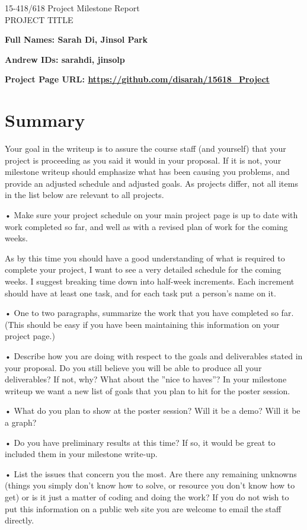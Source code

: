 \documentclass[11pt]{article}
\begin{document}
\begin{center}
\LARGE
15-418/618 \thisterm{} Project Milestone Report
\\ 
PROJECT TITLE
\end{center}
\begin{flushright}
{\large\bf Full Names: Sarah Di, Jinsol Park\makebox[2in][l]{

}}

{\large\bf Andrew IDs: sarahdi, jinsolp\makebox[2in][l]{\tt

}}
\end{flushright}

{\large\bf Project Page URL: \url{https://github.com/disarah/15618\_Project}\makebox[2in][l]{

}}


\section{Summary}
Your goal in the writeup is to assure the course staff (and yourself) that your project is proceeding as you said it would in your proposal. If it is not, your milestone writeup should emphasize what has been causing you problems, and provide an adjusted schedule and adjusted goals. As projects differ, not all items in the list below are relevant to all projects.

• Make sure your project schedule on your main project page is up to date with work completed so far, and well as with a revised plan of work for the coming weeks. 

As by this time you should have a good understanding of what is required to complete your project, I want to see a very detailed schedule for the coming weeks. I suggest breaking time down into half-week increments. Each increment should have at least one task, and for each task put a person’s name on it.

• One to two paragraphs, summarize the work that you have completed so far. (This should be easy if you have been maintaining this information on your project page.)

• Describe how you are doing with respect to the goals and deliverables stated in your proposal. Do you still believe you will be able to produce all your deliverables? If not, why? What about the ”nice to haves”? In your milestone writeup we want a new list of goals that you plan to hit for the poster session.

• What do you plan to show at the poster session? Will it be a demo? Will it be a graph?

• Do you have preliminary results at this time? If so, it would be great to included them in your milestone write-up.

• List the issues that concern you the most. Are there any remaining unknowns (things you simply don’t know how to solve, or resource you don’t know how to get) or is it just a matter of coding and doing the work? If you do not wish to put this information on a public web site you are welcome to email the staff directly.
\end{document}
